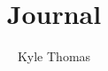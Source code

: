 \documentclass[aps,twocolumn,nobalancelastpage]{revtex4-1}
\begin{document}
\begin{abstract}
\lstset{basicstyle=\ttfamily,mathescape=true}

\hline
\end{abstract}%
\author{Kyle Thomas}\title{Journal}
\maketitle

\end{document}
